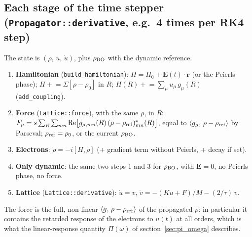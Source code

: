 \documentclass[11pt]{article}
\newcommand{\rBO}{\rho_{\rm BO}}
\newcommand{\inner}[2]{\langle #1,\,#2\rangle}
\begin{document}
\subsection*{Each stage of the time stepper (\texttt{Propagator::derivative}, e.g.\ 4 times per RK4 step)}
The state is $(\rho,\,u,\,\dot u)$, plus $\rBO$ with the dynamic reference.
\begin{enumerate}
\item \textbf{Hamiltonian} (\texttt{build\_hamiltonian}): $H = H_0+\mathbf E(t)\cdot\mathbf r$ (or the Peierls phase);
  $H \mathrel{+}= \Sigma[\rho-\rho_0]$ in $R$; $H(R)\mathrel{+}=\sum_\mu u_\mu\,g_\mu(R)$ (\texttt{add\_coupling}).
\item \textbf{Force} (\texttt{Lattice::force}), with the same $\rho$, in $R$:
  $F_\mu = s\sum_R\sum_{mn}\mathrm{Re}\big[g_{\mu,mn}(R)\,(\rho-\rho_{\rm ref})^*_{mn}(R)\big]$, equal to
  $\inner{g_\mu}{\rho-\rho_{\rm ref}}$ by Parseval; $\rho_{\rm ref}=\rho_0$, or the current $\rBO$.
\item \textbf{Electrons}: $\dot\rho = -i[H,\rho]$ (+ gradient term without Peierls, + decay if set).
\item \textbf{Only dynamic}: the same two steps 1 and 3 for $\rBO$, with $\mathbf E=0$, no Peierls phase, no force.
\item \textbf{Lattice} (\texttt{Lattice::derivative}): $\dot u = v$,
  $\dot v = -(Ku+F)/M - (2/\tau)\,v$.
\end{enumerate}
The force is the full, non-linear $\inner{g}{\rho-\rho_{\rm ref}}$ of the propagated $\rho$: in particular it contains
the retarded response of the electrons to $u(t)$ at all orders, which is what the linear-response quantity
$\Pi(\omega)$ of section~\ref{sec:pi_omega} describes.
\end{document}
